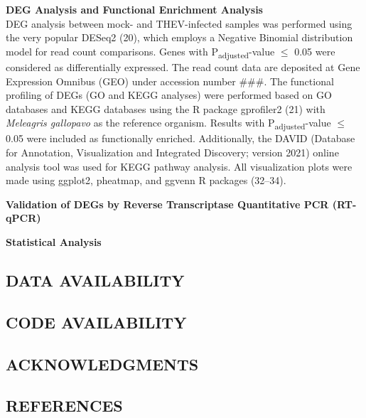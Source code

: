 \documentclass[
]{article}
\begin{document}
\textbf{DEG Analysis and Functional Enrichment Analysis}\\
DEG analysis between mock- and THEV-infected samples was performed using
the very popular DESeq2 (20), which employs a Negative Binomial
distribution model for read count comparisons. Genes with
P\textsubscript{adjusted}-value \(\leq\) 0.05 were considered as
differentially expressed. The read count data are deposited at Gene
Expression Omnibus (GEO) under accession number \#\#\#. The functional
profiling of DEGs (GO and KEGG analyses) were performed based on GO
databases and KEGG databases using the R package gprofiler2 (21) with
\emph{Meleagris gallopavo} as the reference organism. Results with
P\textsubscript{adjusted}-value \(\leq\) 0.05 were included as
functionally enriched. Additionally, the DAVID (Database for Annotation,
Visualization and Integrated Discovery; version 2021) online analysis
tool was used for KEGG pathway analysis. All visualization plots were
made using ggplot2, pheatmap, and ggvenn R packages (32--34).

\textbf{Validation of DEGs by Reverse Transcriptase Quantitative PCR
(RT-qPCR)}

\textbf{Statistical Analysis} \newpage

\subsection{DATA AVAILABILITY}\label{data-availability}

\newpage

\subsection{CODE AVAILABILITY}\label{code-availability}

\newpage

\subsection{ACKNOWLEDGMENTS}\label{acknowledgments}

\newpage

\subsection{REFERENCES}\label{references}

\setlength{\parindent}{-0.25in}
\setlength{\leftskip}{0.25in}

\noindent
\end{document}
